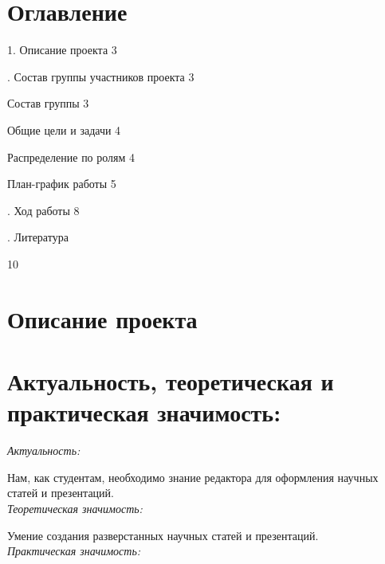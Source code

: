 \documentclass{article}
\begin{document}
\section*{Оглавление}
\LARGE{
1. Описание проекта \hspace{79mm} 3
\vspace{\baselineskip}

. Состав группы участников проекта \hspace{35mm} 3
\vspace{\baselineskip}

Состав группы \hspace{87mm} 3
\vspace{\baselineskip}

Общие цели и задачи \hspace{72mm} 4
\vspace{\baselineskip}

Распределение по ролям \hspace{63mm} 4
\vspace{\baselineskip}

План-график работы \hspace{71mm} 5
\vspace{\baselineskip}

. Ход работы \hspace{96mm} 8
\vspace{\baselineskip}

. Литература} \hspace{93mm} 10
\newpage
\section{Описание проекта}
	\section*{Актуальность, теоретическая и практическая значимость:}
	
	
	\noindent\emph{Актуальность:}
	
	
	\noindent Нам, как студентам, необходимо знание редактора для оформления научных статей и презентаций.\\
	
	
	\noindent\emph{Теоретическая значимость:}
	
	
	\noindent Умение создания разверстанных научных статей и презентаций.\\
	
	
	\noindent\emph{Практическая значимость:}
	
\end{document}
